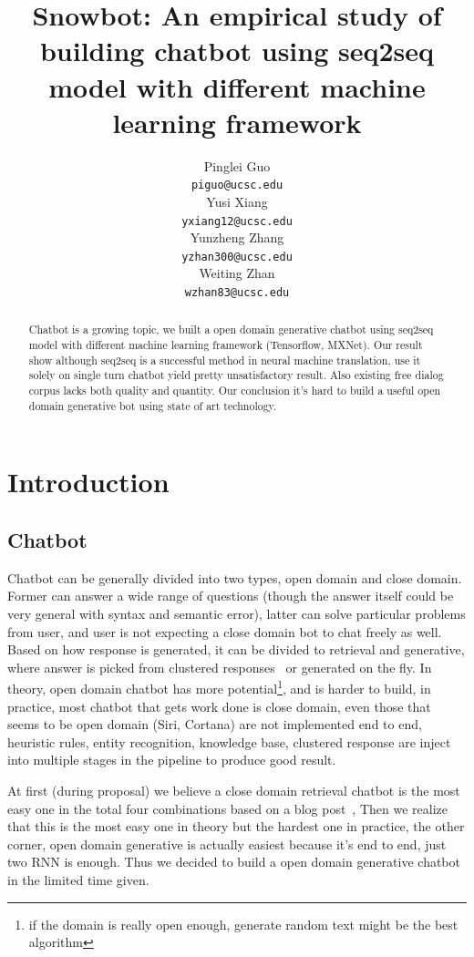 \documentclass{article}
\title{Snowbot: An empirical study of building chatbot using seq2seq model with different machine learning framework}
\author{
Pinglei Guo \\
\texttt{piguo@ucsc.edu} \\
\And
Yusi Xiang \\
\texttt{yxiang12@ucsc.edu} \\
\And
Yunzheng Zhang \\
\texttt{yzhan300@ucsc.edu} \\
\And
Weiting Zhan \\
\texttt{wzhan83@ucsc.edu} \\
}
\begin{document}
\maketitle

\begin{abstract}
    Chatbot is a growing topic, we built a open domain generative chatbot using seq2seq model with different machine learning framework (Tensorflow, MXNet).
    Our result show although seq2seq is a successful method in neural machine translation, use it solely on single turn chatbot yield pretty unsatisfactory result.
    Also existing free dialog corpus lacks both quality and quantity.
    Our conclusion it's hard to build a useful open domain generative bot using state of art technology.
\end{abstract}

\section{Introduction}
\label{sec:introduction}

\subsection{Chatbot}
\label{subsec:chatbot}

Chatbot can be generally divided into two types, open domain and close domain.
Former can answer a wide range of questions (though the answer itself could be very general with syntax and semantic error),
latter can solve particular problems from user, and user is not expecting a close domain bot to chat freely as well.
Based on how response is generated, it can be divided to retrieval and generative,
where answer is picked from clustered responses~\cite{kannan2016smart} or generated on the fly.
In theory, open domain chatbot has more potential\footnote{if the domain is really open enough, generate random text might be the best algorithm},
and is harder to build, in practice, most chatbot that gets work done is close domain,
even those that seems to be open domain (Siri, Cortana) are not implemented end to end, heuristic rules, entity recognition, knowledge base,
clustered response are inject into multiple stages in the pipeline to produce good result.

At first (during proposal) we believe a close domain retrieval chatbot is the most easy one in the total four combinations based on a blog post~\cite{wildml},
Then we realize that this is the most easy one in theory but the hardest one in practice, the other corner,
open domain generative is actually easiest because it's end to end, just two RNN is enough.
Thus we decided to build a open domain generative chatbot in the limited time given.
\end{document}
